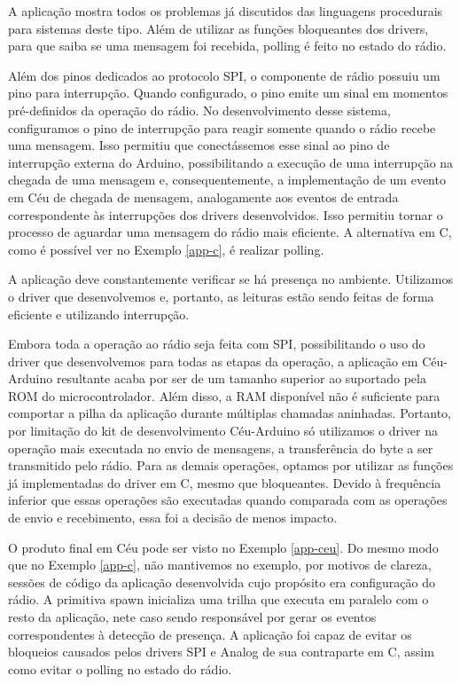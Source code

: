 \documentclass[11pt]{article}
\begin{document}
\par A aplicação mostra todos os problemas já discutidos das linguagens procedurais para sistemas deste tipo. Além de utilizar as funções bloqueantes dos drivers, para que saiba se uma mensagem foi recebida, polling é feito no estado do rádio.
\par Além dos pinos dedicados ao protocolo SPI, o componente de rádio possuiu um pino para interrupção. Quando configurado, o pino emite um sinal em momentos pré-definidos da operação do rádio. No desenvolvimento desse sistema, configuramos o pino de interrupção para reagir somente quando o rádio recebe uma mensagem. Isso permitiu que conectássemos esse sinal ao pino de interrupção externa do Arduino, possibilitando a execução de uma interrupção na chegada de uma mensagem e, consequentemente, a implementação de um evento em Céu de chegada de mensagem, analogamente aos eventos de entrada correspondente às interrupções dos drivers desenvolvidos. Isso permitiu tornar o processo de aguardar uma mensagem do rádio mais eficiente. A alternativa em C, como é possível ver no Exemplo \ref{app-c}, é realizar polling.
\par A aplicação deve constantemente verificar se há presença no ambiente. Utilizamos o driver que desenvolvemos e, portanto, as leituras estão sendo feitas de forma eficiente e utilizando interrupção.
\par Embora toda a operação ao rádio seja feita com SPI, possibilitando o uso do driver que desenvolvemos para todas as etapas da operação, a aplicação em Céu-Arduino resultante acaba por ser de um tamanho superior ao suportado pela ROM do microcontrolador. Além disso, a RAM disponível não é suficiente para comportar a pilha da aplicação durante múltiplas chamadas aninhadas. Portanto, por limitação do kit de desenvolvimento Céu-Arduino só utilizamos o driver na operação mais executada no envio de mensagens, a transferência do byte a ser transmitido pelo rádio. Para as demais operações, optamos por utilizar as funções já implementadas do driver em C, mesmo que bloqueantes. Devido à frequência inferior que essas operações são executadas quando comparada com as operações de envio e recebimento, essa foi a decisão de menos impacto. 
\par O produto final em Céu pode ser visto no Exemplo \ref{app-ceu}. Do mesmo modo que no Exemplo \ref{app-c}, não mantivemos no exemplo, por motivos de clareza, sessões de código da aplicação desenvolvida cujo propósito era configuração do rádio. A primitiva spawn inicializa uma trilha que executa em paralelo com o resto da aplicação, nete caso sendo responsável por gerar os eventos correspondentes à detecção de presença. A aplicação foi capaz de evitar os bloqueios causados pelos drivers SPI e Analog de sua contraparte em C, assim como evitar o polling no estado do rádio.
\end{document}
